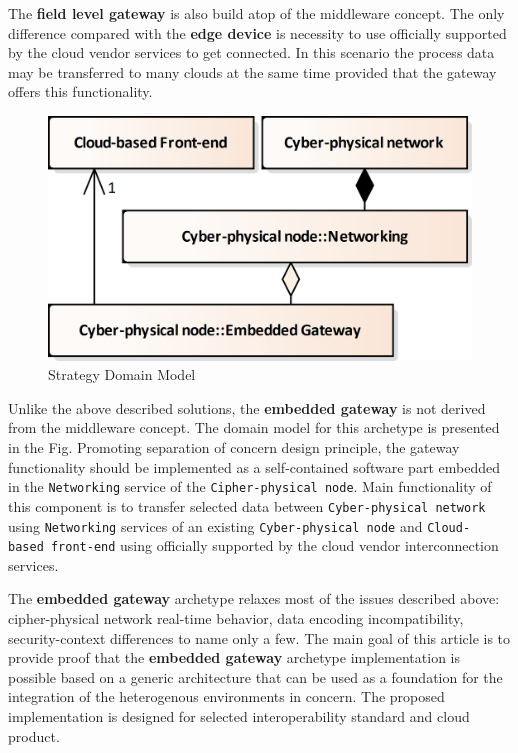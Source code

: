 \documentclass[
]{article}
\begin{document}
The \textbf{field level gateway} is also build atop of the middleware
concept. The only difference compared with the \textbf{edge device} is
necessity to use officially supported by the cloud vendor services to
get connected. In this scenario the process data may be transferred to
many clouds at the same time provided that the gateway offers this
functionality.

\begin{figure}
\centering
\includegraphics{../.Media/StrategyDomainModel.png}
\caption{Strategy Domain Model}
\end{figure}

Unlike the above described solutions, the \textbf{embedded gateway} is
not derived from the middleware concept. The domain model for this
archetype is presented in the Fig. Promoting separation of concern
design principle, the gateway functionality should be implemented as a
self-contained software part embedded in the \texttt{Networking} service
of the \texttt{Cipher-physical\ node}. Main functionality of this
component is to transfer selected data between
\texttt{Cyber-physical\ network} using \texttt{Networking} services of
an existing \texttt{Cyber-physical\ node} and
\texttt{Cloud-based\ front-end} using officially supported by the cloud
vendor interconnection services.

The \textbf{embedded gateway} archetype relaxes most of the issues
described above: cipher-physical network real-time behavior, data
encoding incompatibility, security-context differences to name only a
few. The main goal of this article is to provide proof that the
\textbf{embedded gateway} archetype implementation is possible based on
a generic architecture that can be used as a foundation for the
integration of the heterogenous environments in concern. The proposed
implementation is designed for selected interoperability standard and
cloud product.
\end{document}
